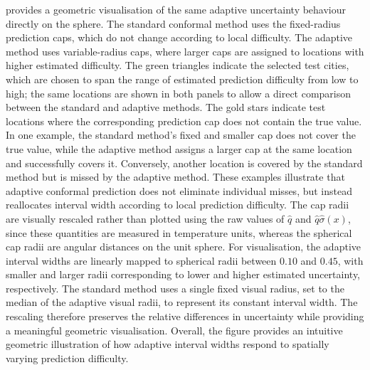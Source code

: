 \documentclass[11pt,a4paper]{report}
\begin{document}
 provides a geometric visualisation of the same adaptive uncertainty behaviour directly on the sphere. The standard conformal method uses the fixed-radius prediction caps, which do not change according to local difficulty. The adaptive method uses variable-radius caps, where larger caps are assigned to locations with higher estimated difficulty. The green triangles indicate the selected test cities, which are chosen to span the range of estimated prediction difficulty from low to high; the same locations are shown in both panels to allow a direct comparison between the standard and adaptive methods. The gold stars indicate test locations where the corresponding prediction cap does not contain the true value. In one example, the standard method's fixed and smaller cap does not cover the true value, while the adaptive method assigns a larger cap at the same location and successfully covers it. Conversely, another location is covered by the standard method but is missed by the adaptive method. These examples illustrate that adaptive conformal prediction does not eliminate individual misses, but instead reallocates interval width according to local prediction difficulty. The cap radii are visually rescaled rather than plotted using the raw values of $\hat q$ and $\hat q\hat\sigma(x)$, since these quantities are measured in temperature units, whereas the spherical cap radii are angular distances on the unit sphere. For visualisation, the adaptive interval widths are linearly mapped to spherical radii between $0.10$ and $0.45$, with smaller and larger radii corresponding to lower and higher estimated uncertainty, respectively. The standard method uses a single fixed visual radius, set to the median of the adaptive visual radii, to represent its constant interval width. The rescaling therefore preserves the relative differences in uncertainty while providing a meaningful geometric visualisation. Overall, the figure provides an intuitive geometric illustration of how adaptive interval widths respond to spatially varying prediction difficulty.
\end{document}
